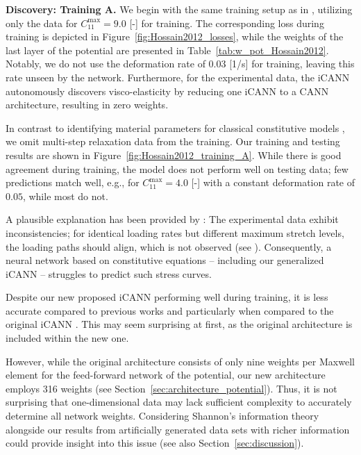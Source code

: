 \textbf{Discovery: Training A.} We begin with the same training setup as in \cite{holthusen2024}, utilizing only the data for $ C_{11}^{\text{max}} = 9.0 $ [-] for training. 
The corresponding loss during training is depicted in Figure~\ref{fig:Hossain2012_losses}, while the weights of the last layer of the potential are presented in Table~\ref{tab:w_pot_Hossain2012}. 
Notably, we do not use the deformation rate of $ 0.03 $ [1/s] for training, leaving this rate unseen by the network. 
Furthermore, for the experimental data, the iCANN autonomously discovers visco-elasticity by reducing one iCANN to a CANN architecture, resulting in zero weights.

In contrast to identifying material parameters for classical constitutive models \cite{hossain2012}, we omit multi-step relaxation data from the training. 
Our training and testing results are shown in Figure~\ref{fig:Hossain2012_training_A}. 
While there is good agreement during training, the model does not perform well on testing data; few predictions match well, e.g., for $ C_{11}^{\text{max}} = 4.0 $ [-] with a constant deformation rate of $0.05$, while most do not.

A plausible explanation has been provided by \citet{AbdolaziziLinkaEtAl2023}: 
The experimental data exhibit inconsistencies; for identical loading rates but different maximum stretch levels, the loading paths should align, which is not observed (see \cite{holthusen2024}). 
Consequently, a neural network based on constitutive equations -- including our generalized iCANN -- struggles to predict such stress curves.

Despite our new proposed iCANN performing well during training, it is less accurate compared to previous works \cite{hossain2012,AbdolaziziLinkaEtAl2023} and particularly when compared to the original iCANN \cite{holthusen2024}. 
This may seem surprising at first, as the original architecture is included within the new one.

However, while the original architecture consists of only nine weights per Maxwell element for the feed-forward network of the potential, our new architecture employs 316 weights (see Section~\ref{sec:architecture_potential}). 
Thus, it is not surprising that one-dimensional data may lack sufficient complexity to accurately determine all network weights. 
Considering Shannon's information theory \cite{shannon1948} alongside our results from artificially generated data sets with richer information could provide insight into this issue (see also Section~\ref{sec:discussion}).

